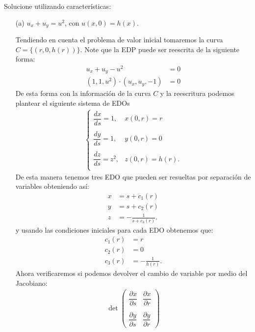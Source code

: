\begin{homeworkProblem}
    Solucione utilizando características:
\begin{itemize}
    \item[(a)] $u_x+u_y=u^2$, con $u(x, 0)=h(x)$.
    \begin{solucion}
     Tendiendo en cuenta el problema de valor inicial tomaremos la curva \\$C=\{(r,0,h(r))\}$. Note que la EDP puede ser reescrita de la siguiente forma:
     \begin{align*}
         u_x+u_y-u^2&=0\\
         (1,1,u^2)\cdot(u_x,u_y,-1)&=0
     \end{align*}
     De esta forma con la información de la curva $C$ y la reescritura podemos plantear el siguiente sistema de EDOs 
    \begin{align*}
        \begin{cases}
            \dfrac{dx}{ds}=1,& x(0,r)=r\\
            \\
            \dfrac{dy}{ds}=1,& y(0,r)=0\\
            \\
            \dfrac{dz}{ds}=z^2,& z(0,r)=h(r).\\
        \end{cases}
    \end{align*}
    De esta manera tenemos tres EDO que pueden ser resueltas por separación de variables obteniendo así:
    \begin{align*}
        x&=s+c_1(r)\\
        y&=s+c_2(r)\\
        z&=-\frac{1}{s+c_3(r)}.
    \end{align*}
    y usando las condiciones iniciales para cada EDO obtenemos que:
    \begin{align*}
        c_1(r)&=r\\
        c_2(r)&=0\\
        c_3(r)&=-\frac{1}{h(r)}.
    \end{align*}
    Ahora verificaremos si podemos devolver el cambio de variable por medio del Jacobiano:
    \begin{align*}
       \left. \det\begin{pmatrix}
            \dfrac{\partial x}{\partial s} & \dfrac{\partial x}{\partial r}\\
            & \\
            \dfrac{\partial y}{\partial s} & \dfrac{\partial y}{\partial r}

\end{pmatrix}
\end{align*}
\end{solucion}
\end{itemize}
\end{homeworkProblem}

